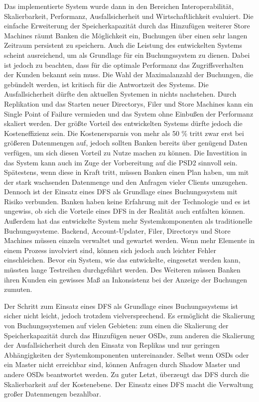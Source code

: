 \documentclass[12pt,oneside,a4paper,parskip]{scrbook}
\begin{document}
Das implementierte System wurde dann in den Bereichen Interoperabilität, Skalierbarkeit, Performanz, Ausfallsicherheit und Wirtschaftlichkeit evaluiert. Die einfache Erweiterung der Speicherkapazität durch das Hinzufügen weiterer Store Machines räumt Banken die Möglichkeit ein, Buchungen über einen sehr langen Zeitraum persistent zu speichern. Auch die Leistung des entwickelten Systems scheint ausreichend, um als Grundlage für ein Buchungssystem zu dienen. Dabei ist jedoch zu beachten, dass für die optimale Performanz das Zugriffsverhalten der Kunden bekannt sein muss. Die Wahl der Maximalanzahl der Buchungen, die gebündelt werden, ist kritisch für die Antwortzeit des Systems. Die Ausfallsicherheit dürfte den aktuellen Systemen in nichts nachstehen. Durch Replikation und das Starten neuer Directorys, Filer und Store Machines kann ein Single Point of Failure vermieden und das System ohne Einbußen der Performanz skaliert werden. Der größte Vorteil des entwickelten Systems dürfte jedoch die Kosteneffizienz sein. Die Kostenersparnis von mehr als 50 \% tritt zwar erst bei größeren Datenmengen auf, jedoch sollten Banken bereits über genügend Daten verfügen, um sich diesen Vorteil zu Nutze machen zu können. Die Investition in das System kann auch im Zuge der Vorbereitung auf die PSD2 sinnvoll sein. Spätestens, wenn diese in Kraft tritt, müssen Banken einen Plan haben, um mit der stark wachsenden Datenmenge und den Anfragen vieler Clients umzugehen. Dennoch ist der Einsatz eines DFS als Grundlage eines Buchungssystem mit Risiko verbunden. Banken haben keine Erfahrung mit der Technologie und es ist ungewiss, ob sich die Vorteile eines DFS in der Realität auch entfalten können. Außerdem hat das entwickelte System mehr Systemkomponenten als traditionelle Buchungssysteme. Backend, Account-Updater, Filer, Directorys und Store Machines müssen einzeln verwaltet und gewartet werden. Wenn mehr Elemente in einem Prozess involviert sind, können sich jedoch auch leichter Fehler einschleichen. Bevor ein System, wie das entwickelte, eingesetzt werden kann, müssten lange Testreihen durchgeführt werden. Des Weiteren müssen Banken ihren Kunden ein gewisses Maß an Inkonsistenz bei der Anzeige der Buchungen zumuten. 

Der Schritt zum Einsatz eines DFS als Grundlage eines Buchungssystems ist sicher nicht leicht, jedoch trotzdem vielversprechend. Es ermöglicht die Skalierung von Buchungssystemen auf vielen Gebieten:
zum einen die Skalierung der Speicherkapazität durch das Hinzufügen neuer OSDs, zum anderen die Skalierung der Ausfallsicherheit durch den Einsatz von Replikas und nur geringen Abhängigkeiten der Systemkomponenten untereinander. Selbst wenn OSDs oder ein Master nicht erreichbar sind, können Anfragen durch Shadow Master und andere OSDs beantwortet werden. Zu guter Letzt, überzeugt das DFS durch die Skalierbarkeit auf der Kostenebene. Der Einsatz eines DFS macht die Verwaltung großer Datenmengen bezahlbar.
\end{document}

